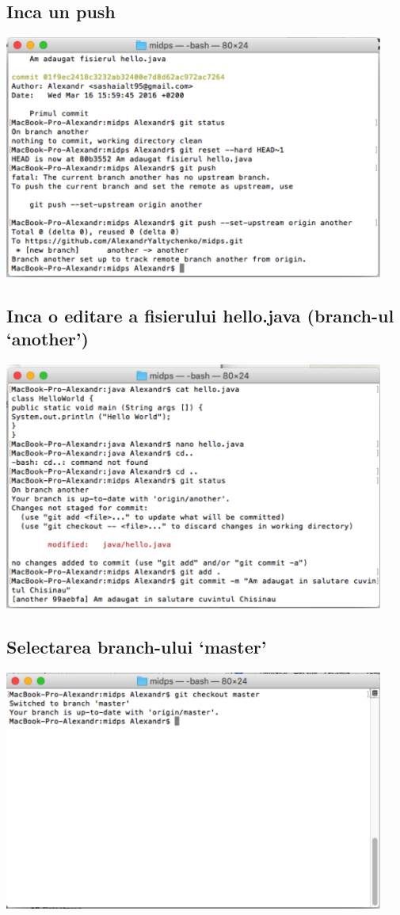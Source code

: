 \documentclass[12pt]{article}
\begin{document}
\subsection{Inca un push}
\includegraphics[width=12.5cm]{images/20}
\subsection{Inca o editare a fisierului hello.java (branch-ul ‘another’)}
\includegraphics[width=12.5cm]{images/21}
\subsection{Selectarea branch-ului ‘master’}
\includegraphics[width=12.5cm]{images/22}
\end{document}
